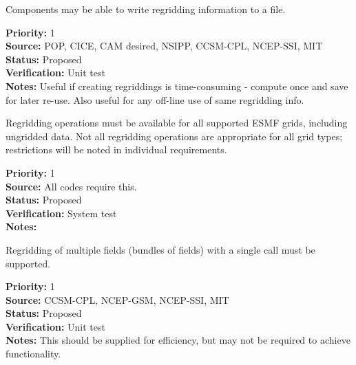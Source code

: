 
Components may be able to write regridding information to a file.

\begin{reqlist}
{\bf Priority:} 1 \\
{\bf Source:} POP, CICE, CAM desired, NSIPP, CCSM-CPL, NCEP-SSI, MIT \\
{\bf Status:} Proposed \\
{\bf Verification:} Unit test \\
{\bf Notes:} Useful if creating regriddings is time-consuming - compute once
             and save for later re-use.  Also useful for any off-line
             use of same regridding info.
\end{reqlist}


Regridding operations must be available for all supported ESMF grids,
including ungridded data.  Not all regridding operations are appropriate for
all grid types; restrictions will be noted in individual requirements.

\begin{reqlist}
{\bf Priority:} 1 \\
{\bf Source:} All codes require this. \\
{\bf Status:} Proposed \\
{\bf Verification:} System test \\
{\bf Notes:} 
\end{reqlist}


Regridding of multiple fields (bundles of fields) with
a single call must be supported.

\begin{reqlist}
{\bf Priority:} 1  \\
{\bf Source:} CCSM-CPL, NCEP-GSM, NCEP-SSI, MIT \\
{\bf Status:} Proposed \\
{\bf Verification:} Unit test \\
{\bf Notes:} This should be supplied for efficiency, but may not
             be required to achieve functionality.
\end{reqlist}


